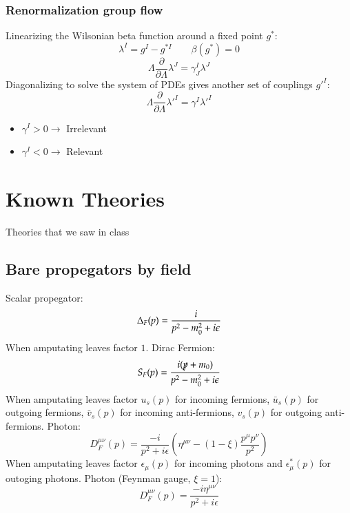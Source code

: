 \documentclass{article}
\begin{document}
\subsubsection*{Renormalization group flow}
Linearizing the Wilsonian beta function around a fixed point $g^*$:
\begin{equation}
    \lambda^I = g^I - g^{*I} \qquad \beta(g^*) = 0
\end{equation}
\begin{equation}
    \Lambda \frac{\partial}{\partial \Lambda}\lambda^J = \gamma^I_J\lambda^J
\end{equation}
Diagonalizing to solve the system of PDEs gives another set of couplings $g'^I$:
\begin{equation}
    \Lambda \frac{\partial}{\partial \Lambda}\lambda'^I = \gamma^I\lambda'^I
\end{equation}
\begin{itemize}
    \item $\gamma^I > 0 \rightarrow$ Irrelevant
    \item $\gamma^I < 0 \rightarrow$ Relevant
\end{itemize}

\newpage
\section{Known Theories}
Theories that we saw in class
\subsection{Bare propegators by field}
Scalar propegator:
\begin{equation}
    \Delta_F(p) = \frac{i}{p^2 - m_0^2 + i\epsilon} \\
\end{equation}
When amputating leaves factor $1$.
\newline
Dirac Fermion:
\begin{equation}
    S_F(p) = \frac{i(\slashed{p} + m_0)}{p^2 - m_0^2 + i\epsilon} \\
\end{equation}
When amputating leaves factor $u_s(p)$ for incoming fermions, $\bar{u}_s(p)$ for outgoing fermions, $\bar{v}_s(p)$ for incoming anti-fermions, $v_s(p)$ for outgoing anti-fermions.
\newline
Photon:
\begin{equation}
    D_F^{\mu\nu}(p) = \frac{-i}{p^2 + i\epsilon}\left(
        \eta^{\mu\nu} - (1 - \xi)\frac{p^\mu p^\nu}{p^2}
    \right)
\end{equation}
When amputating leaves factor $\epsilon_\mu(p)$ for incoming photons and $\epsilon_\mu^*(p)$ for outoging photons.
\newline
Photon (Feynman gauge, $\xi=1$):
\begin{equation}
    D_F^{\mu\nu}(p) = \frac{-i\eta^{\mu\nu}}{p^2 + i\epsilon}
\end{equation}
\end{document}
